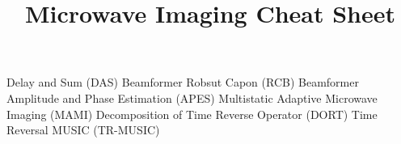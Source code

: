\documentclass[14pt]{extarticle}
\title{Microwave Imaging Cheat Sheet}
\begin{document}
	\maketitle
	\begin{outline}
		\1	Delay and Sum (DAS) Beamformer
		\1	Robsut Capon (RCB) Beamformer 
		\1	Amplitude and Phase Estimation (APES)
		\1	Multistatic Adaptive Microwave Imaging (MAMI)
		\1	Decomposition of Time Reverse Operator (DORT)
		\1	Time Reversal MUSIC (TR-MUSIC)
	\end{outline}
\end{document}
